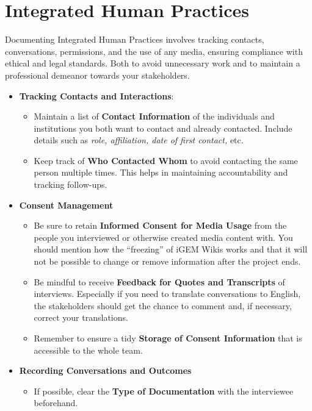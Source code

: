 \section{Integrated Human Practices} \label{sec:ihp}  
Documenting Integrated Human Practices involves tracking contacts, conversations, permissions, and the use of any media, ensuring compliance with ethical and legal standards. \newline
Both to avoid unnecessary work and to maintain a professional demeanor towards your stakeholders.
\begin{itemize}
    \item \textbf{Tracking Contacts and Interactions}:
    \begin{itemize}
        \item Maintain a list of \textbf{Contact Information} of the individuals and institutions you both want to contact and already contacted.
        Include details such as \textit{role, affiliation, date of first contact,} etc.
        \item Keep track of \textbf{Who Contacted Whom} to avoid contacting the same person multiple times.
        This helps in maintaining accountability and tracking follow-ups.
    \end{itemize}
    \item \textbf{Consent Management} 
    \begin{itemize}
        \item Be sure to retain \textbf{Informed Consent for Media Usage} from the people you interviewed or otherwise created media content with.
        You should mention how the ``freezing'' of iGEM Wikis works and that it will not be possible to change or remove information after the project ends.
        \item Be mindful to receive \textbf{Feedback for Quotes and Transcripts} of interviews.  Especially if you need to translate conversations to English, the stakeholders should get the chance to comment and, if necessary, correct your translations.
        \item Remember to ensure a tidy \textbf{Storage of Consent Information} that is accessible to the whole team.
    \end{itemize}
    \item \textbf{Recording Conversations and Outcomes }
    \begin{itemize}
        \item If possible, clear the \textbf{Type of Documentation} with the interviewee beforehand.

\end{itemize}
\end{itemize}
